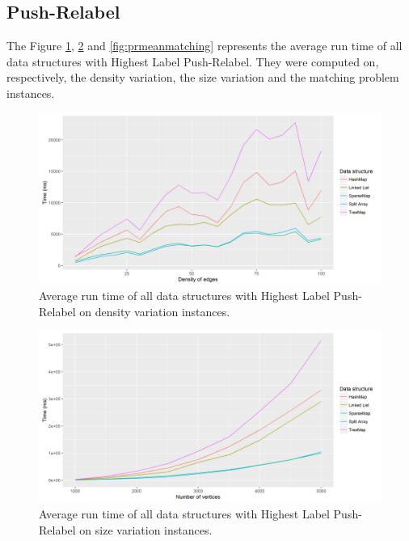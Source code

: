 \subsection{Push-Relabel}	
The Figure \ref{fig:prmeandensity}, \ref{fig:prmeansize} and \ref{fig:prmeanmatching} represents the average run time of all data structures with Highest Label Push-Relabel. They were computed on, respectively, the density variation, the size variation and the matching problem instances.
\begin{figure}[H]
\begin{center}
\includegraphics[scale=0.5]{images/results/prmeandensity.png}
\caption{Average run time of all data structures with Highest Label Push-Relabel on density variation instances.}
\label{fig:prmeandensity}
\end{center}
\end{figure}
\begin{figure}[H]
\begin{center}
\includegraphics[scale=0.5]{images/results/prmeansize.png}
\caption{Average run time of all data structures with Highest Label Push-Relabel on size variation instances.}
\label{fig:prmeansize}
\end{center}
\end{figure}
